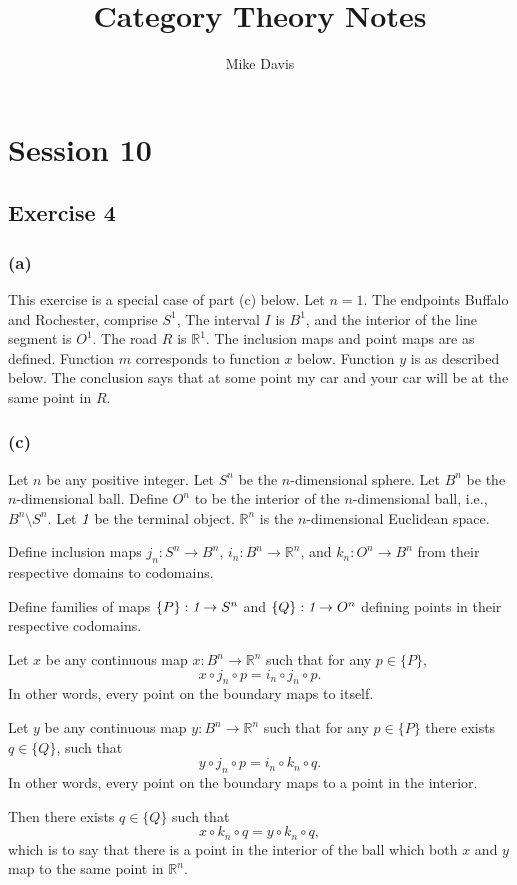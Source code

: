 \documentclass[12pt]{article}
\begin{document}
\title{Category Theory Notes}
\author{Mike Davis}
\maketitle


\section{Session 10}
\subsection{Exercise 4}
\subsubsection{(a)}
This exercise is a special case of part (c) below.  Let $n = 1.$  The
endpoints Buffalo and Rochester, comprise $S^1$, The interval $I$ is
$B^1$, and the interior of the line segment is $O^1$.  The road $R$ is
$\mathbb{R}^1$.  The inclusion maps and point maps are as defined.  Function
$m$ corresponds to function $x$ below.  Function $y$ is as described
below.  The conclusion says that at some point my car and your car
will be at the same point in $R$.

\subsubsection{(c)}

Let $n$ be any positive integer.
Let $S^n$ be the $n$-dimensional sphere.  
Let $B^n$ be the $n$-dimensional ball.  
Define $O^n$ to be the interior of the $n$-dimensional ball,
i.e., $B^n \setminus S^n$.  
Let $\emph{1}$ be the terminal object.
$\mathbb{R}^n$ is the $n$-dimensional Euclidean space.

Define inclusion maps 
$j_n : S^n \rightarrow B^n$,
$i_n : B^n \rightarrow \mathbb{R}^n$,
and 
$k_n : O^n \rightarrow B^n$
from their respective domains to codomains.

Define families of maps
$\{P\} : \emph{1} \rightarrow S^n$
and 
$\{Q\} : \emph{1} \rightarrow O^n$
defining points in their respective codomains.

Let $x$ be any continuous map 
$x : B^n \rightarrow \mathbb{R}^n$ 
such that for any 
$p \in \{P\}$,
\[x \circ j_n \circ p = i_n \circ j_n \circ p.\]
In other words, every point on the boundary maps to itself.

Let $y$ be any continuous map 
$y : B^n \rightarrow \mathbb{R}^n$ 
such that for any
$p \in \{P\}$ 
there exists 
$q \in \{Q\}$,
such that 
\[y \circ j_n \circ p = i_n \circ k_n \circ q.\]
In other words, every point on the boundary maps to a point in the
interior.

Then there exists $q \in \{Q\}$ such that 
\[x \circ k_n \circ q = y \circ k_n \circ q,\]
which is to say that there is a point in the interior of the ball
which both $x$ and $y$ map to the same point in $\mathbb{R}^n$.
\end{document}
